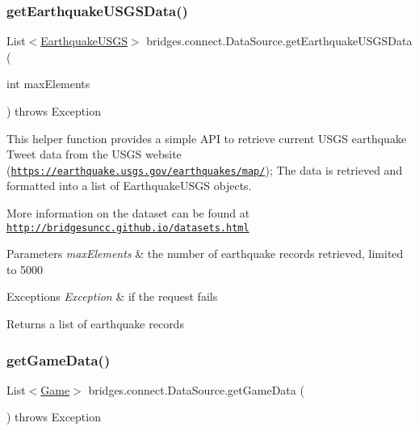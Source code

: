 \subsubsection{\texorpdfstring{get\+Earthquake\+U\+S\+G\+S\+Data()}{getEarthquakeUSGSData()}}
{\footnotesize\ttfamily List$<$\hyperlink{classbridges_1_1data__src__dependent_1_1_earthquake_u_s_g_s}{Earthquake\+U\+S\+GS}$>$ bridges.\+connect.\+Data\+Source.\+get\+Earthquake\+U\+S\+G\+S\+Data (\begin{DoxyParamCaption}\item[{int}]{max\+Elements }\end{DoxyParamCaption}) throws Exception}

This helper function provides a simple A\+PI to retrieve current U\+S\+GS earthquake Tweet data from the U\+S\+GS website (\href{https://earthquake.usgs.gov/earthquakes/map/}{\tt https\+://earthquake.\+usgs.\+gov/earthquakes/map/}); The data is retrieved and formatted into a list of Earthquake\+U\+S\+GS objects.

More information on the dataset can be found at \href{http://bridgesuncc.github.io/datasets.html}{\tt http\+://bridgesuncc.\+github.\+io/datasets.\+html}


\begin{DoxyParams}{Parameters}
{\em max\+Elements} & the number of earthquake records retrieved, limited to 5000 \\
\hline
\end{DoxyParams}

\begin{DoxyExceptions}{Exceptions}
{\em Exception} & if the request fails\\
\hline
\end{DoxyExceptions}
\begin{DoxyReturn}{Returns}
a list of earthquake records 
\end{DoxyReturn}
\mbox{\label{classbridges_1_1connect_1_1_data_source_ab3744c6b103281724bdd832da0924312}} 
\subsubsection{\texorpdfstring{get\+Game\+Data()}{getGameData()}}
{\footnotesize\ttfamily List$<$\hyperlink{classbridges_1_1data__src__dependent_1_1_game}{Game}$>$ bridges.\+connect.\+Data\+Source.\+get\+Game\+Data (\begin{DoxyParamCaption}{ }\end{DoxyParamCaption}) throws Exception}

